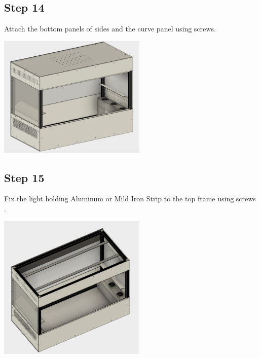 \documentclass[a4paper,12pt,oneside]{book}
\begin{document}
\subsection*{Step 14}
Attach the bottom panels of sides and the curve panel using screws.\\
\begin{center}
  \includegraphics[width=200pt]{14}
  \end{center}
\subsection*{Step 15}
Fix the light holding Aluminum or Mild Iron Strip to the top frame using screws .\\
\begin{center}
  \includegraphics[width=200pt]{15}
  \end{center}
\end{document}

